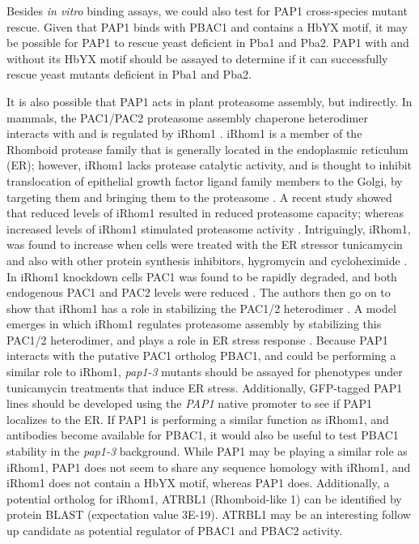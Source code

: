 	Besides \textit{in vitro} binding assays, we could also test for PAP1 cross-species mutant rescue.  Given that PAP1 binds with PBAC1 and contains a HbYX motif, it may be possible for PAP1 to rescue yeast deficient in Pba1 and Pba2. PAP1 with and without its HbYX motif should be assayed to determine if it can successfully rescue yeast mutants deficient in Pba1 and Pba2.

	It is also possible that PAP1 acts in plant proteasome assembly, but indirectly. In mammals, the PAC1/PAC2 proteasome assembly chaperone heterodimer interacts with and is regulated by iRhom1 \citep{lee15}. iRhom1 is a member of the Rhomboid protease family that is generally located in the endoplasmic reticulum (ER); however, iRhom1 lacks protease catalytic activity, and is thought to inhibit translocation of epithelial growth factor ligand family members to the Golgi, by targeting them and bringing them to the proteasome \citep{lee15}. A recent study showed that reduced levels of iRhom1 resulted in reduced proteasome capacity; whereas increased levels of iRhom1 stimulated proteasome activity \citep{lee15}. Intriguingly, iRhom1, was found to increase when cells were treated with the ER stressor tunicamycin and also with other protein synthesis inhibitors, hygromycin and cycloheximide \citep{lee15}. In iRhom1 knockdown cells PAC1 was found to be rapidly degraded, and both endogenous PAC1 and PAC2 levels were reduced \citep{lee15}. The authors then go on to show that iRhom1 has a role in stabilizing the PAC1/2 heterodimer \citep{lee15}. A model emerges in which iRhom1 regulates proteasome assembly by stabilizing this PAC1/2 heterodimer, and plays a role in ER stress response \citep{lee15}. Because PAP1 interacts with the putative PAC1 ortholog PBAC1, and could be performing a similar role to iRhom1, \textit{pap1-3} mutants should be assayed for phenotypes under tunicamycin treatments that induce ER stress. Additionally, GFP-tagged PAP1 lines should be developed using the \textit{PAP1} native promoter to see if PAP1 localizes to the ER. If PAP1 is performing a similar function as iRhom1, and antibodies become available for PBAC1, it would also be useful to test PBAC1 stability in the \textit{pap1-3} background. While PAP1 may be playing a similar role as iRhom1, PAP1 does not seem to share any sequence homology with iRhom1, and iRhom1 does not contain a HbYX motif, whereas PAP1 does. Additionally, a potential ortholog for iRhom1, ATRBL1 (Rhomboid-like 1) can be identified by protein BLAST (expectation value 3E-19). ATRBL1 may be an interesting follow up candidate as potential regulator of PBAC1 and PBAC2 activity.
	
